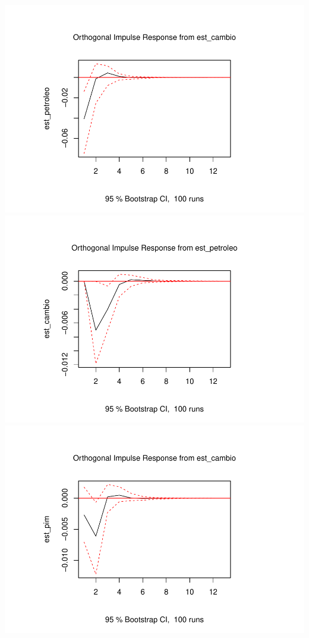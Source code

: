 \documentclass[12pt]{article}
\begin{document}
\includegraphics{artigo_files/figure-latex/unnamed-chunk-14-7.pdf}
\includegraphics{artigo_files/figure-latex/unnamed-chunk-14-8.pdf}
\includegraphics{artigo_files/figure-latex/unnamed-chunk-14-9.pdf}
\end{document}
